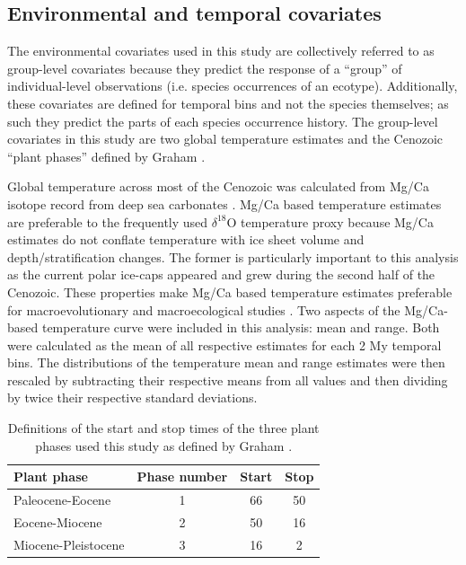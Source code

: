 \subsection*{Environmental and temporal covariates}
The environmental covariates used in this study are collectively referred to as group-level covariates because they predict the response of a ``group'' of individual-level observations (i.e. species occurrences of an ecotype). Additionally, these covariates are defined for temporal bins and not the species themselves; as such they predict the parts of each species occurrence history. The group-level covariates in this study are two global temperature estimates and the Cenozoic ``plant phases'' defined by Graham \citep{Graham2011a}. 

Global temperature across most of the Cenozoic was calculated from Mg/Ca isotope record from deep sea carbonates \citep{Cramer2011}. Mg/Ca based temperature estimates are preferable to the frequently used \(\delta^{18}\)O temperature proxy \citep{Zachos2001,Zachos2008,Alroy2000g,Figueirido2012} because Mg/Ca estimates do not conflate temperature with ice sheet volume and depth/stratification changes. The former is particularly important to this analysis as the current polar ice-caps appeared and grew during the second half of the Cenozoic. These properties make Mg/Ca based temperature estimates preferable for macroevolutionary and macroecological studies \citep{Ezard2016a}. Two aspects of the Mg/Ca-based temperature curve were included in this analysis: mean and range. Both were calculated as the mean of all respective estimates for each 2 My temporal bins. The distributions of the temperature mean and range estimates were then rescaled by subtracting their respective means from all values and then dividing by twice their respective standard deviations.

\begin{table}
  \centering
  \caption[Plant phase defintions]{Definitions of the start and stop times of the three plant phases used this study as defined by Graham \citep{Graham2011a}.}
  \label{tab:plant_def}
  \begin{tabular}{l c c c}
    \hline
    Plant phase & Phase number & Start & Stop \\
    \hline
    Paleocene-Eocene & 1 & 66 & 50 \\
    Eocene-Miocene & 2 & 50 & 16 \\
    Miocene-Pleistocene & 3 & 16 & 2 \\
  \end{tabular}
\end{table}

